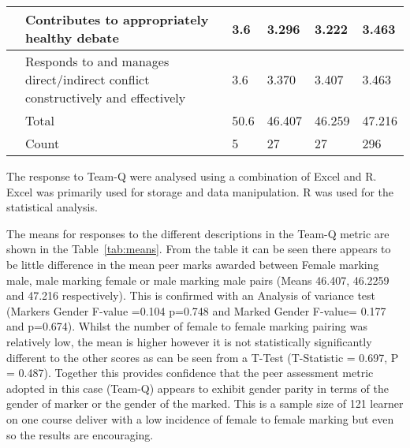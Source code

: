 \documentclass[sigconf, anonymous=true]{acmart}
\begin{document}
\begin{table*}[ht]
\begin{tabular} {| p{3cm} | p{8cm} | p{1cm}| p{1cm} | p{1cm}| p{1cm} |}
\hline
                                    & Contributes to appropriately healthy debate                                                      & 3.6                                                     & 3.296                                                 & 3.222                                                 & 3.463                                               \\
                                    
\hline
                                    & Responds to and manages direct/indirect conflict constructively and effectively                  & 3.6                                                     & 3.370                                                 & 3.407                                                 & 3.463                                               \\
\hline
& Total                                                                                                              & 50.6                                                    & 46.407                                                & 46.259                                                & 47.216                                              \\
\hline
& Count                                                                                                              & 5                                                       & 27                                                    & 27                                                    & 296
\\
\hline
\end{tabular}
\label{tab:means}
\end{table*}
The response to Team-Q were analysed using a combination of Excel and R. Excel was primarily used for storage and data manipulation. R was used for the statistical analysis. 

The means for responses to the different descriptions in the Team-Q metric are shown in the Table~\ref{tab:means}. From the table it can be seen there appears to be little difference in the mean peer marks awarded between Female marking male, male marking female or male marking male pairs (Means 46.407, 46.2259 and 47.216 respectively). This is confirmed with an Analysis of variance test (Markers Gender F-value =0.104 p=0.748 and Marked Gender F-value= 0.177 and p=0.674). Whilst the number of female to female marking pairing was relatively low, the mean is higher however it is not statistically significantly different to the other scores as can be seen from a T-Test (T-Statistic = 0.697, P = 0.487). Together this provides confidence that the peer assessment metric adopted in this case (Team-Q) appears to exhibit gender parity in terms of the gender of marker or the gender of the marked. This is a sample size of 121 learner on one course deliver with a low incidence of female to female marking but even so the results are encouraging.
\end{document}
